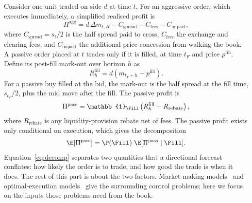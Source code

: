 Consider one unit traded on side $d$ at time $t$. For an aggressive order, which executes
immediately, a simplified realised profit is
\begin{equation}
  \Pi^{\text{agg}} = d\,\Delta m_{t,H} - C_{\text{spread}} - C_{\text{fees}} - C_{\text{impact}},
\end{equation}
where $C_{\text{spread}} = s_t/2$ is the half spread paid to cross, $C_{\text{fees}}$ the exchange
and clearing fees, and $C_{\text{impact}}$ the additional price concession from walking the book.
A passive order placed at $t$ trades only if it is filled, at time $t_F$ and price
$p^{\text{fill}}$. Define its post-fill mark-out over horizon $h$ as
\begin{equation}
  R^{\text{fill}}_{h} = d\left(m_{t_F+h} - p^{\text{fill}}\right).
  \label{eq:markout}
\end{equation}
For a passive buy filled at the bid, the mark-out is the half spread at the fill time,
$s_{t_F}/2$, plus the mid move after the fill. The passive profit is
\begin{equation}
  \Pi^{\text{pass}} = \mathbb{1}_{\Fill}\left(R^{\text{fill}}_{h} + R_{\text{rebate}}\right),
\end{equation}
where $R_{\text{rebate}}$ is any liquidity-provision rebate net of fees.
 The passive profit exists
only conditional on execution, which gives the decomposition
\begin{equation}
  \E[\Pi^{\text{pass}}] = \P(\Fill)\; \E[\Pi^{\text{pass}} \mid \Fill].
  \label{eq:decomp}
\end{equation}
Equation~\eqref{eq:decomp} separates two quantities that a directional forecast conflates: how
likely the order is to trade, and how good the trade is when it does. The rest of this part is
about the two factors. Market-making models~\citep{avellaneda2008,cartea2015} and optimal-execution
models~\citep{almgren2001} give the surrounding control problems; here we focus on the inputs
those problems need from the book.

